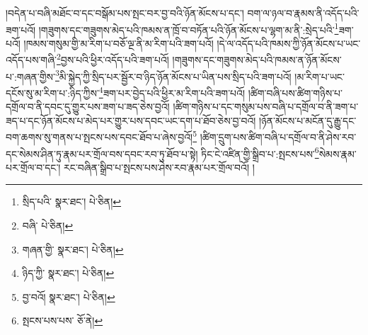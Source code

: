 །བདེན་པ་བཞི་མཐོང་བ་དང་བསྒོམ་པས་སྤང་བར་བྱ་བའི་ཉོན་མོངས་པ་དང་། བག་ལ་ཉལ་བ་རྣམས་ནི་འདོད་པའི་ཟག་པའོ། །གཟུགས་དང་གཟུགས་མེད་པའི་ཁམས་ན་ཁྲོ་བ་བཏོན་པའི་ཉོན་མོངས་པ་ལྷག་མ་ནི་:སྲེད་པའི་\footnote{སྲིད་པའི་  སྣར་ཐང་།  པེ་ཅིན། }ཟག་པའོ། །ཁམས་གསུམ་གྱི་མ་རིག་པ་བཅོ་ལྔ་ནི་མ་རིག་པའི་ཟག་པའོ། །དེ་ལ་འདོད་པའི་ཁམས་ཀྱི་ཉོན་མོངས་པ་ཡང་འདོད་པས་གཞི་\footnote{བཞི་  པེ་ཅིན། }བྱས་པའི་ཕྱིར་འདོད་པའི་ཟག་པའོ། །གཟུགས་དང་གཟུགས་མེད་པའི་ཁམས་ན་ཉོན་མོངས་པ་:གཞན་གྱིས་\footnote{གཞན་གྱི་  སྣར་ཐང་།  པེ་ཅིན། }མི་སྐྱེད་ཀྱི་སྲིད་པར་སྦྱོར་བ་ཉིད་ཉོན་མོངས་པ་ཡིན་པས་སྲིད་པའི་ཟག་པའོ། །མ་རིག་པ་ཡང་དངོས་སུ་མ་རིག་པ་:ཉིད་ཀྱིས་\footnote{ཉིད་ཀྱི་  སྣར་ཐང་།  པེ་ཅིན། }ཟག་པར་བྱེད་པའི་ཕྱིར་མ་རིག་པའི་ཟག་པའོ། །ཚིག་བཞི་པས་ཚིག་གཉིས་པ་དགྲོལ་བ་ནི་དབང་དུ་གྱུར་པས་ཟག་པ་ཟད་ཅེས་བྱའོ། །ཚིག་གཉིས་པ་དང་གསུམ་པས་བཞི་པ་དགྲོལ་བ་ནི་ཟག་པ་ཟད་པ་དང་ཉོན་མོངས་པ་མེད་པར་གྱུར་པས་དབང་ཡང་དག་པ་ཐོབ་ཅེས་བྱ་བའོ། །ཉོན་མོངས་པ་མངོན་དུ་རྒྱུ་དང་བག་ཆགས་སུ་གནས་པ་སྤངས་པས་དབང་ཐོབ་པ་ཞེས་བྱའོ།\footnote{བྱ་བའོ།  སྣར་ཐང་།  པེ་ཅིན། } །ཚིག་དྲུག་པས་ཚིག་བཞི་པ་དགྲོལ་བ་ནི་ཤེས་རབ་དང་སེམས་ཤིན་ཏུ་རྣམ་པར་གྲོལ་བས་དབང་རབ་ཏུ་ཐོབ་པ་སྟེ། ཏིང་ངེ་འཛིན་གྱི་སྒྲིབ་པ་:སྤངས་པས་\footnote{སྤངས་པས་པས་  ཅོ་ནེ། }སེམས་རྣམ་པར་གྲོལ་བ་དང་། རང་བཞིན་སྒྲིབ་པ་སྤངས་པས་ཤེས་རབ་རྣམ་པར་གྲོལ་བའོ། །

